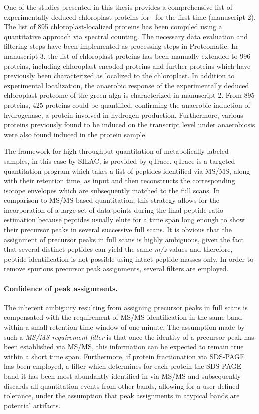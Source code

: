 One of the studies presented in this thesis provides a comprehensive list of 
experimentally deduced chloroplast proteins for \cre~for the first time
(manuscript 2).
The list of 895 chloroplast-localized proteins has been compiled using
a quantitative approach via spectral counting.
The necessary data evaluation and filtering steps have been implemented
as processing steps in Proteomatic.
In manuscript 3, the list of chloroplast proteins has been manually extended 
to 996 proteins, including chloroplast-encoded proteins and further proteins
which have previously been characterized as localized to the chloroplast.
In addition to experimental localization, the anaerobic response of the 
experimentally deduced chloroplast proteome of the green alga is characterized 
in manuscript 2. 
From 895 proteins, 425 proteins could be quantified, confirming the anaerobic 
induction of hydrogenase, a protein involved in hydrogen production.
Furthermore, various proteins previously found to be induced on the transcript
level under anaerobiosis were also found induced in the protein sample.

The framework for high-throughput quantitation of metabolically labeled 
samples, in this case by SILAC, is provided by qTrace.
qTrace is a targeted quantitation program which takes a list of peptides
identified via MS/MS, along with their retention time, as input and then 
reconstructs the corresponding isotope envelopes which are subsequently 
matched to the full scans.
In comparison to MS/MS-based quantitation, this strategy allows for the
incorporation of a large set of data points during the final peptide ratio
estimation because peptides usually elute for a time span long enough to
show their precursor peaks in several successive full scans.
It is obvious that the assignment of precursor peaks in full scans is highly
ambiguous, given the fact that several distinct peptides can yield the
same {\em m/z} values and therefore, peptide identification is not possible
using intact peptide masses only.
In order to remove spurious precursor peak assignments, several filters are 
employed.

\paragraph{Confidence of peak assignments.}

The inherent ambiguity resulting from assigning precursor peaks in full scans
is compensated with the requirement of MS/MS identification in the same band
within a small retention time window of one minute.
The assumption made by such a {\em MS/MS requirement filter} is that once the
identity of a precursor peak has been established via MS/MS, this information
can be expected to remain true within a short time span.
Furthermore, if protein fractionation via SDS-PAGE has been employed, a filter
which determines for each protein the SDS-PAGE band it has been most abundantly
identified in via MS/MS and subsequently discards all quantitation events
from other bands, allowing for a user-defined tolerance, under the assumption
that peak assignments in atypical bands are potential artifacts.


